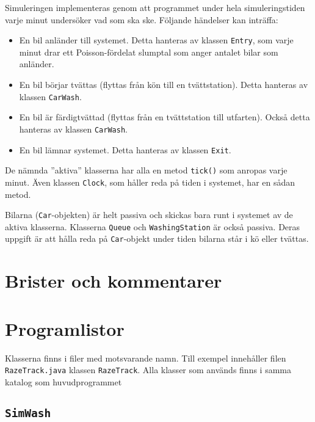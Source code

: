 \documentclass[a4paper]{article}
\newcommand{\code}[1]{\texttt{#1}} %
\begin{document}
\vspace{\baselineskip}
Simuleringen implementeras genom att programmet under hela simuleringstiden varje minut undersöker vad som ska ske. Följande händelser kan inträffa:

\begin{itemize}
\item En bil anländer till systemet. Detta hanteras av klassen \code{Entry}, som varje minut drar ett Poisson-fördelat slumptal som anger antalet bilar som anländer.
\item En bil börjar tvättas (flyttas från kön till en tvättstation). Detta hanteras av klassen \code{CarWash}.
\item En bil är färdigtvättad (flyttas från en tvättstation till utfarten). Också detta hanteras av klassen \code{CarWash}.
\item En bil lämnar systemet. Detta hanteras av klassen \code{Exit}.
\end{itemize}


De nämnda ''aktiva'' klasserna har alla en metod \code{tick()} som anropas varje minut. Även klassen \code{Clock}, som håller reda på tiden i systemet, har en sådan metod.

Bilarna (\code{Car}-objekten) är helt passiva och skickas bara runt i systemet av de aktiva klasserna. Klasserna \code{Queue} och \code{WashingStation} är också passiva. Deras uppgift är att hålla reda på \code{Car}-objekt under tiden bilarna står i kö eller tvättas. 


\section{Brister och kommentarer}



\section{Programlistor}
Klasserna finns i filer med motsvarande namn. Till exempel innehåller filen  \code{RazeTrack.java} klassen \code{RazeTrack}. Alla klasser som används finns i samma katalog som huvudprogrammet

\subsection{\code{SimWash}}




\end{document}
